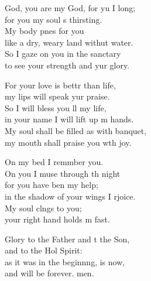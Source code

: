 \settowidth{\versewidth}{My soul shall be filled as with a banquet, *}
\begin{psalmverse}%
  \begin{patverse}
     God, you are my God, for yu I long;\Med\\
for you my soul \pointup{\i}s thirsting.\\
My body p\pointup{\i}nes for you\Med\\
like a dry, weary land withut water.\\
So I gaze on you in the sanctary\Med\\
to see your strength and yur glory.

For your love is bettr than life,\Med\\
my lips will speak yur praise.\\
So I will bless you ll my life,\Med\\
in your name I will lift up m hands.\\
My soul shall be filled as with  banquet,\Med\\
my mouth shall praise you w\pointup{\i}th joy.

On my bed I remmber you.\Med\\
On you I muse through th night\\
for you have ben my help;\Med\\
in the shadow of your wings I rjoice.\\
My soul cl\pointup{\i}ngs to you;\Med\\
your right hand holds m fast.

Glory to the Father and t the Son,\Med\\
and to the Hol Spirit:\\
as it was in the beginn\pointup{\i}ng, is now,\Med\\
and will be forever. men.
  \end{patverse}
\end{psalmverse}
